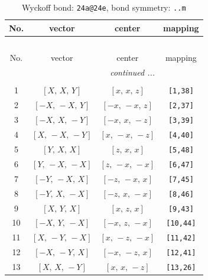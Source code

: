 \documentclass[fleqn,8pt]{jsarticle}
\begin{document}
\begin{longtable}{cccc}
\caption{Wyckoff bond: {\tt 24a@24e}, bond symmetry: {\tt ..m}}
 \\
 \hline \hline
No. & vector & center & mapping \\ \hline \endfirsthead

\multicolumn{3}{l}{\tablename\ \thetable{}} \\
 \hline \hline
No. & vector & center & mapping \\ \hline \endhead

 \hline \hline
\multicolumn{3}{r}{\footnotesize\it continued ...} \\ \endfoot

 \hline \hline
\multicolumn{3}{r}{} \\ \endlastfoot

1 & $\left[ X,\, X,\, Y \right]$ & $\left[ x,\, x,\, z \right]$ & {\tt [1,38]} \\ \hline
2 & $\left[ - X,\, - X,\, Y \right]$ & $\left[ - x,\, - x,\, z \right]$ & {\tt [2,37]} \\ \hline
3 & $\left[ - X,\, X,\, - Y \right]$ & $\left[ - x,\, x,\, - z \right]$ & {\tt [3,39]} \\ \hline
4 & $\left[ X,\, - X,\, - Y \right]$ & $\left[ x,\, - x,\, - z \right]$ & {\tt [4,40]} \\ \hline
5 & $\left[ Y,\, X,\, X \right]$ & $\left[ z,\, x,\, x \right]$ & {\tt [5,48]} \\ \hline
6 & $\left[ Y,\, - X,\, - X \right]$ & $\left[ z,\, - x,\, - x \right]$ & {\tt [6,47]} \\ \hline
7 & $\left[ - Y,\, - X,\, X \right]$ & $\left[ - z,\, - x,\, x \right]$ & {\tt [7,45]} \\ \hline
8 & $\left[ - Y,\, X,\, - X \right]$ & $\left[ - z,\, x,\, - x \right]$ & {\tt [8,46]} \\ \hline
9 & $\left[ X,\, Y,\, X \right]$ & $\left[ x,\, z,\, x \right]$ & {\tt [9,43]} \\ \hline
10 & $\left[ - X,\, Y,\, - X \right]$ & $\left[ - x,\, z,\, - x \right]$ & {\tt [10,44]} \\ \hline
11 & $\left[ X,\, - Y,\, - X \right]$ & $\left[ x,\, - z,\, - x \right]$ & {\tt [11,42]} \\ \hline
12 & $\left[ - X,\, - Y,\, X \right]$ & $\left[ - x,\, - z,\, x \right]$ & {\tt [12,41]} \\ \hline
13 & $\left[ X,\, X,\, - Y \right]$ & $\left[ x,\, x,\, - z \right]$ & {\tt [13,26]} \\ \hline

\end{longtable}
\end{document}
